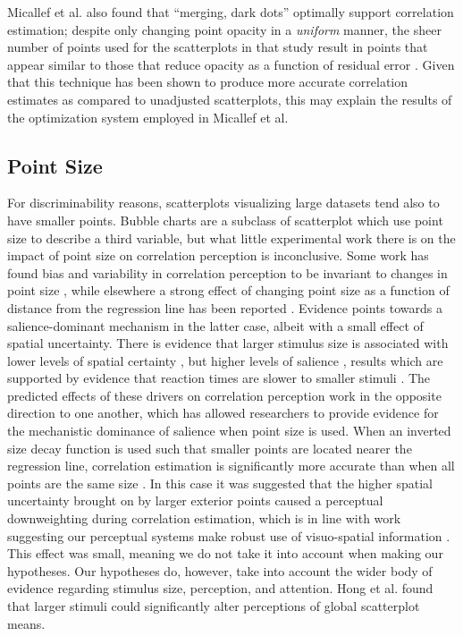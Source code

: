 \documentclass[manuscript, review, anonymous, screen]{acmart}
\begin{document}
Micallef et al. \citep{micallef_2017} also found that ``merging, dark
dots'' optimally support correlation estimation; despite only changing
point opacity in a \emph{uniform} manner, the sheer number of points
used for the scatterplots in that study result in points that appear
similar to those that reduce opacity as a function of residual error
\citep{strain_2023}. Given that this technique has been shown to produce
more accurate correlation estimates as compared to unadjusted
scatterplots, this may explain the results of the optimization system
employed in Micallef et al. \citep{micallef_2017}

\hypertarget{sec-point-size}{%
\subsection{Point Size}\label{sec-point-size}}

For discriminability reasons, scatterplots visualizing large datasets
tend also to have smaller points. Bubble charts are a subclass of
scatterplot which use point size to describe a third variable, but what
little experimental work there is on the impact of point size on
correlation perception is inconclusive. Some work has found bias and
variability in correlation perception to be invariant to changes in
point size \citep{rensink_2012, rensink_2014}, while elsewhere a strong
effect of changing point size as a function of distance from the
regression line has been reported \citep{strain_2023b}. Evidence points
towards a salience-dominant mechanism in the latter case, albeit with a
small effect of spatial uncertainty. There is evidence that larger
stimulus size is associated with lower levels of spatial certainty
\citep{alais_2004}, but higher levels of salience \citep{healey_2011},
results which are supported by evidence that reaction times are slower
to smaller stimuli \citep{gramazio_2014, osaka_1976}. The predicted
effects of these drivers on correlation perception work in the opposite
direction to one another, which has allowed researchers to provide
evidence for the mechanistic dominance of salience when point size is
used. When an inverted size decay function is used such that smaller
points are located nearer the regression line, correlation estimation is
significantly more accurate than when all points are the same size
\citep{strain_2023b}. In this case it was suggested that the higher
spatial uncertainty brought on by larger exterior points caused a
perceptual downweighting during correlation estimation, which is in line
with work suggesting our perceptual systems make robust use of
visuo-spatial information
\citep{strain_2023b, warren_2002, warren_2004}. This effect was small,
meaning we do not take it into account when making our hypotheses. Our
hypotheses do, however, take into account the wider body of evidence
regarding stimulus size, perception, and attention. Hong et al.
\citep{hong_2021} found that larger stimuli could significantly alter
perceptions of global scatterplot means.
\end{document}
